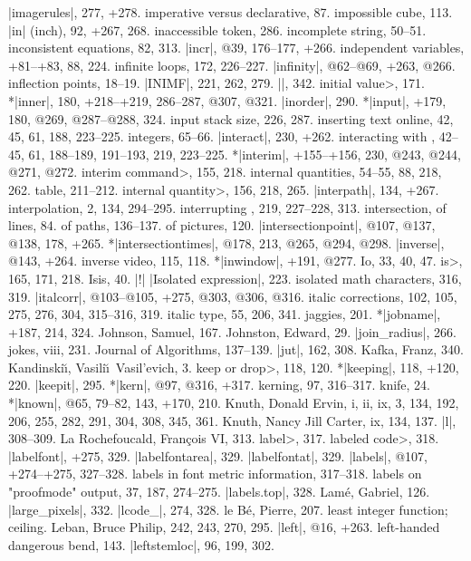 |imagerules|, 277, +278.
imperative versus declarative, 87.
impossible cube, 113.
|in| (inch), 92, +267, 268.
inaccessible token, 286.
incomplete string, 50--51.
inconsistent equations, 82, 313.
|incr|, @39, 176--177, +266.
independent variables, +81--+83, 88, 224.
infinite loops, 172, 226--227.
|infinity|, @62--@69, +263, @266.
inflection points, 18--19.
|INIMF|, 221, 262, 279.
|\init|, 342.
\<initial value>, 171.
*|inner|, 180, +218--+219, 286--287, @307, @321.
|inorder|, 290.
*|input|, +179, 180, @269, @287--@288, 324.
input stack size, 226, 287.
inserting text online, 42, 45, 61, 188, 223--225.
integers, 65--66.
|interact|, 230, +262.
interacting with \MF, 42--45, 61, 188--189, 191--193, 219, 223--225.
*|interim|, +155--+156, 230, @243, @244, @271, @272.
\<interim command>, 155, 218.
internal quantities, 54--55, 88, 218, 262.
\sub table, 211--212.
\<internal quantity>, 156, 218, 265.
|interpath|, 134, +267.
interpolation, 2, 134, 294--295.
interrupting \MF, 219, 227--228, 313.
intersection, of lines, 84.
\sub of paths, 136--137.
\sub of pictures, 120.
|intersectionpoint|, @107, @137, @138, 178, +265.
*|intersectiontimes|, @178, 213, @265, @294, @298.
|inverse|, @143, +264.
inverse video, 115, 118.
*|inwindow|, +191, @277.
Io, 33, 40, 47.
\<is>, 165, 171, 218.
Isis, 40.
|!| |Isolated expression|, 223.
isolated math characters, 316, 319.
|italcorr|, @103--@105, +275, @303, @306, @316.
italic corrections, 102, 105, 275, 276, 304, 315--316, 319.
italic type, 55, 206, 341.
\newletter
jaggies, 201.
*|jobname|, +187, 214, 324.
Johnson, Samuel, 167.
Johnston, Edward, 29.
|join_radius|, 266.
jokes, viii, 231.
Journal of Algorithms, 137--139.
|jut|, 162, 308.
\newletter
Kafka, Franz, 340.
Kandinski\u\i, Vasili\u\i\ Vasil'evich, 3.
\<keep or drop>, 118, 120.
*|keeping|, 118, +120, 220.
|keepit|, 295.
*|kern|, @97, @316, +317.
kerning, 97, 316--317.
knife, 24.
*|known|, @65, 79--82, 143, +170, 210.
Knuth, Donald Ervin, i, ii, ix, 3, 134, 192, 206, 255, 282, 291, 304, 308, 345,
 361.
Knuth, Nancy Jill Carter, ix, 134, 137.
\newletter
|l|, 308--309.
La Rochefoucald, Fran\c cois VI, 313.
\<label>, 317.
\<labeled code>, 318.
|labelfont|, +275, 329.
|labelfontarea|, 329.
|labelfontat|, 329.
|labels|, @107, +274--+275, 327--328.
labels in font metric information, 317--318.
labels on "proofmode" output, 37, 187, 274--275.
|labels.top|, 328.
Lam\'e, Gabriel, 126.
|large_pixels|, 332.
|lcode_|, 274, 328.
le B\'e, Pierre, 207.
least integer function; \see ceiling.
Leban, Bruce Philip, 242, 243, 270, 295.
|left|, @16, +263.
left-handed dangerous bend, 143.
|leftstemloc|, 96, 199, 302.
